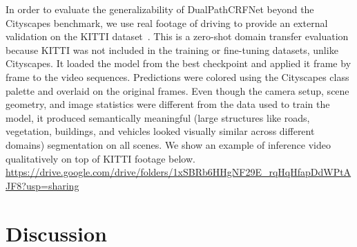 \documentclass[conference]{IEEEtran}
\begin{document}
In order to evaluate the generalizability of DualPathCRFNet beyond the Cityscapes benchmark, we use
real footage of driving to provide an external validation on the KITTI dataset~\cite{geiger2012kitti}. This is a zero-shot domain
transfer evaluation because KITTI was not included in the training or fine-tuning datasets, unlike
Cityscapes. It loaded the model from the best checkpoint and applied it frame by frame to the video
sequences. Predictions were colored using the Cityscapes class palette and overlaid on the original frames.
Even though the camera setup, scene geometry, and image statistics were different from the data used to
train the model, it produced semantically meaningful (large structures like roads, vegetation, buildings,
and vehicles looked visually similar across different domains) segmentation on all scenes. We show an
example of inference video qualitatively on top of KITTI footage below.\\
\url{https://drive.google.com/drive/folders/1xSBRb6HHgNF29E_rqHqHfapDdWPtAJF8?usp=sharing}


 
\section{Discussion}\label{sec:discuss}
\end{document}
